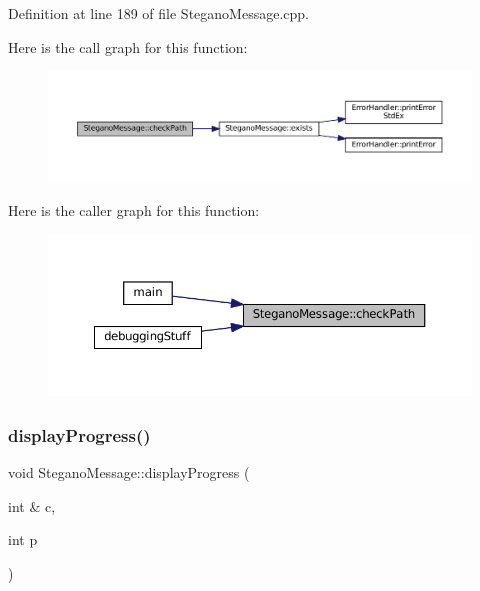 Definition at line 189 of file Stegano\+Message.\+cpp.

Here is the call graph for this function\+:
\nopagebreak
\begin{figure}[H]
\begin{center}
\leavevmode
\includegraphics[width=350pt]{classSteganoMessage_a9d87adef1584cc184ccd4b5d86fba744_cgraph}
\end{center}
\end{figure}
Here is the caller graph for this function\+:
\nopagebreak
\begin{figure}[H]
\begin{center}
\leavevmode
\includegraphics[width=350pt]{classSteganoMessage_a9d87adef1584cc184ccd4b5d86fba744_icgraph}
\end{center}
\end{figure}
\mbox{\label{classSteganoMessage_a50936bb2352eaaa1112280c2ac3ca2d5}} 
\subsubsection{\texorpdfstring{displayProgress()}{displayProgress()}\hspace{0.1cm}{\footnotesize\ttfamily [1/2]}}
{\footnotesize\ttfamily void Stegano\+Message\+::display\+Progress (\begin{DoxyParamCaption}\item[{int \&}]{c,  }\item[{int}]{p }\end{DoxyParamCaption})\hspace{0.3cm}{\ttfamily [private]}}



